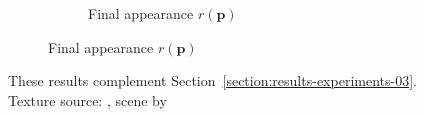 \begin{figure}[]
\begin{subfigure}{\textwidth}
\begin{subfigure}{0.19\textwidth}
            \caption*{Final appearance \(r(\bm{p})\)}
        \end{subfigure}
    \end{subfigure}
    \caption{These results complement Section~\ref{section:results-experiments-03}. Texture source: \citet{Pixar128}, scene by \citet{Bitterli16}}
    \label{fig:ex03-complete-staircase_illum}
\end{figure}
